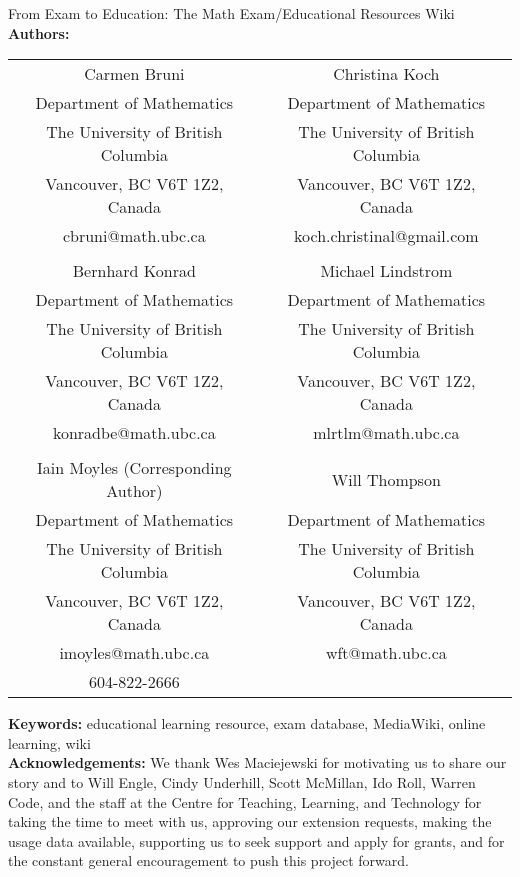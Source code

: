 \documentclass{primus}
\begin{document}
\begin{center}
{\LARGE From Exam to Education: The Math Exam/Educational Resources Wiki}
\\[2cm]
\textbf{Authors:}
\\[0.5cm]
\begin{table}[H]
\centering
\begin{tabular}{cc}
Carmen Bruni					&	Christina Koch\\
Department of Mathematics			&	Department of Mathematics\\
The University of British Columbia		&	The University of British Columbia\\
Vancouver, BC V6T 1Z2, Canada			&	Vancouver, BC V6T 1Z2, Canada\\
cbruni@math.ubc.ca				&	koch.christinal@gmail.com\\\\
Bernhard Konrad					&	Michael Lindstrom\\
Department of Mathematics			&	Department of Mathematics\\
The University of British Columbia		&	The University of British Columbia\\
Vancouver, BC V6T 1Z2, Canada			&	Vancouver, BC V6T 1Z2, Canada\\
konradbe@math.ubc.ca				&	mlrtlm@math.ubc.ca\\\\
Iain Moyles (Corresponding Author)		&	Will Thompson\\
Department of Mathematics			&	Department of Mathematics\\
The University of British Columbia		&	The University of British Columbia\\
Vancouver, BC V6T 1Z2, Canada			&	Vancouver, BC V6T 1Z2, Canada\\
imoyles@math.ubc.ca				&	wft@math.ubc.ca\\
604-822-2666					&
\end{tabular}
\end{table}
\end{center}
\textbf{Keywords:} educational learning resource, exam database, MediaWiki, online learning, wiki
\\[1cm]
\textbf{Acknowledgements:} We thank Wes Maciejewski for motivating us to share our story and to Will Engle, Cindy Underhill, Scott McMillan, Ido Roll, Warren Code, and the staff at the Centre for Teaching, Learning, and Technology for taking the time to meet with us, approving our extension requests, making the usage data available, supporting us to seek support and apply for grants, and for the constant general encouragement to push this project forward.
\end{document}
